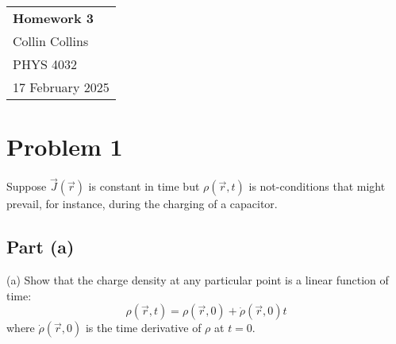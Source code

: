 \documentclass[a4paper,12pt]{article} %
\begin{document}



\thispagestyle{empty} %

\begin{tabular}{p{15.5cm}} %
{\large \bf Homework 3}
\\ Collin Collins \\
PHYS 4032\\
17 February 2025 \\
\hline %
\end{tabular} %

%
%
%
%
%

\section*{Problem 1}
Suppose $\vec{J}(\vec{r})$ is constant in time but $\rho(\vec{r}, t)$ is not-conditions that might prevail, for instance, during the charging of a capacitor.\\
\subsection*{Part (a)}
(a) Show that the charge density at any particular point is a linear function of time:
$$
\rho(\vec{r}, t)=\rho(\vec{r}, 0)+\dot{\rho}(\vec{r}, 0) t
$$
where $\dot{\rho}(\vec{r}, 0)$ is the time derivative of $\rho$ at $t=0$.\\
\end{document}
